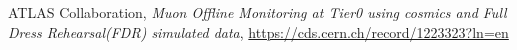 
\begin{thebibliography}{99}

\setlength{\itemsep}{3pt plus 2pt minus 2pt}
\setlength{\parskip}{0pt}

\raggedright

\vspace{-5pt}

ATLAS Collaboration, \textit{Muon Offline Monitoring at Tier0 using cosmics and Full Dress Rehearsal(FDR) simulated data},
{\footnotesize \url{https://cds.cern.ch/record/1223323?ln=en}}

\end{thebibliography}
